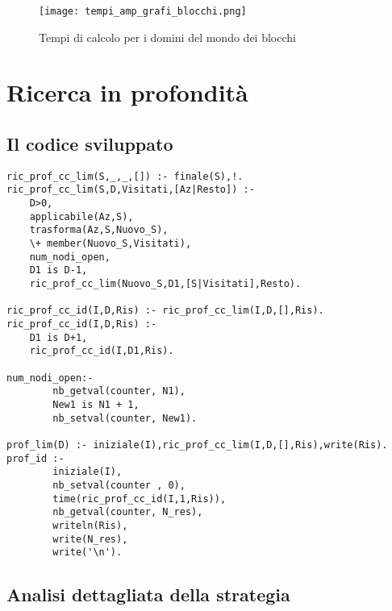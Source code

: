 \begin{figure}[htp]
  \texttt{[image: tempi\_amp\_grafi\_blocchi.png]}
  \caption{Tempi di calcolo per i domini del mondo dei blocchi}
  \label{fig:figure4}
\end{figure}
\newpage
\section{Ricerca in profondità}

\subsection{Il codice sviluppato}

\begin{lstlisting}
ric_prof_cc_lim(S,_,_,[]) :- finale(S),!.
ric_prof_cc_lim(S,D,Visitati,[Az|Resto]) :-
    D>0,
    applicabile(Az,S),
    trasforma(Az,S,Nuovo_S),
    \+ member(Nuovo_S,Visitati),
    num_nodi_open,
    D1 is D-1,
    ric_prof_cc_lim(Nuovo_S,D1,[S|Visitati],Resto).

ric_prof_cc_id(I,D,Ris) :- ric_prof_cc_lim(I,D,[],Ris).
ric_prof_cc_id(I,D,Ris) :-
    D1 is D+1,
    ric_prof_cc_id(I,D1,Ris).

num_nodi_open:-
        nb_getval(counter, N1),
        New1 is N1 + 1,
        nb_setval(counter, New1).

prof_lim(D) :- iniziale(I),ric_prof_cc_lim(I,D,[],Ris),write(Ris).
prof_id :-
        iniziale(I),
        nb_setval(counter , 0),
        time(ric_prof_cc_id(I,1,Ris)),
        nb_getval(counter, N_res),
        writeln(Ris),
        write(N_res),
        write('\n').
\end{lstlisting}

\subsection{Analisi dettagliata della strategia}

